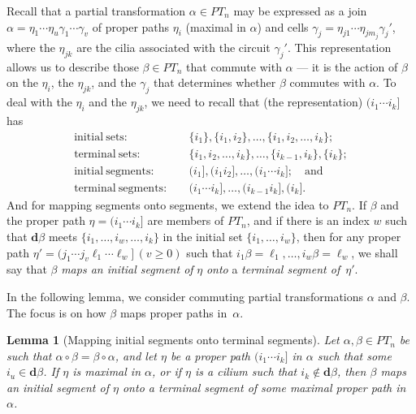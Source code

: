 \documentclass{surv-l}
\numberwithin{equation}{section}
\numberwithin{table}{section}
\numberwithin{figure}{section}
\newtheorem{lemma}[equation]{Lemma}
\theoremstyle{definition}
\begin{document}
Recall that a partial transformation $\alpha\in PT_{n}$ may be
expressed as a join
$\alpha=\eta_{1}\cdots\eta_{u}\gamma_{1}\cdots\gamma_{v}$ of
proper paths $\eta_{i}$ (maximal in $\alpha$) and cells
$\gamma_{j}= \eta_{j1}\cdots\eta_{jm_{j}}\gamma_{j}'$, where the
$\eta_{jk}$ are the cilia associated with the circuit
$\gamma_{j}'$. This representation allows us to describe those
$\beta\in PT_{n}$ that commute with $\alpha$ --- it is the action of
$\beta$ on the $\eta_{i}$, the $\eta_{jk}$, and the $\gamma_{j}$
that determines whether $\beta$ commutes with $\alpha$. To deal
with the $\eta_{i}$ and the $\eta_{jk}$, we need to recall that
(the representation) $(i_{1}\cdots i_{k}]$ has
\begin{align*}
\mathrm{initial\ sets}{:}\quad &\{i_{1}\}, \{i_{1}, i_{2}\},\ldots, \{i_{1}, i_{2},\ldots, i_{k}\};\\
\mathrm{terminal\ sets}{:}\quad &\{i_{1}, i_{2},\ldots,i_{k}\}, \ldots, \{i_{k-1}, i_{k}\}, \{i_{k}\};\\
\mathrm{initial\ segments}{:}\quad &(i_{1}], (i_{1}i_{2}],\ldots, (i_{1}\cdots i_{k}];\quad \mathrm{and} \\
\mathrm{terminal\ segments}{:}\quad &(i_{1}\cdots i_{k}],\ldots, (i_{k-1}i_{k}], (i_{k}].
\end{align*}
And for mapping segments onto segments, we extend the idea to
$PT_{n}$. If $\beta$ and the proper path $\eta=(i_{1}\cdots
i_{k}]$ are members of $PT_{n}$, and if there is an index $w$ such
that $\mathbf{d}\beta$ meets $\{i_{1},\ldots, i_{w},\ldots,
i_{k}\}$ in the initial set $\{i_{1},\ldots, i_{w}\}$, then for
any proper path $\eta'=(j_{1}\cdots j_{v}\ell_{1}\cdots
\ell_{w}]\,(v\geq 0)$ such that
$i_{1}\beta=\ell_{1},\ldots,i_{w}\beta=\ell_{w}$, we shall say
that $\beta$ \emph{maps an initial segment of} $\eta$ \emph{onto}
a \emph{terminal segment of}~$\eta'$.

In the following lemma, we consider commuting partial
transformations $\alpha$ and $\beta$. The focus is on how $\beta$
maps proper paths in~$\alpha$.

\begin{lemma}[Mapping initial segments onto terminal
segments]\label{lem12.58.1} Let $\alpha,\beta\in PT_{n}$ be such
that $\alpha \circ\beta=\beta \circ\alpha$, and let $\eta$ be a
proper path $(i_{1}\cdots i_{k}]$ in $\alpha$ such that some
$i_{u}\in \mathbf{d}\beta$. If $\eta$ is maximal in $\alpha$, or
if $\eta$ is a cilium such that $i_{k}\not\in \mathbf{d}\beta$,
then $\beta$ maps an initial segment of $\eta$ onto a terminal
segment of some maximal proper path in~$\alpha$.
\end{lemma}
\end{document}

